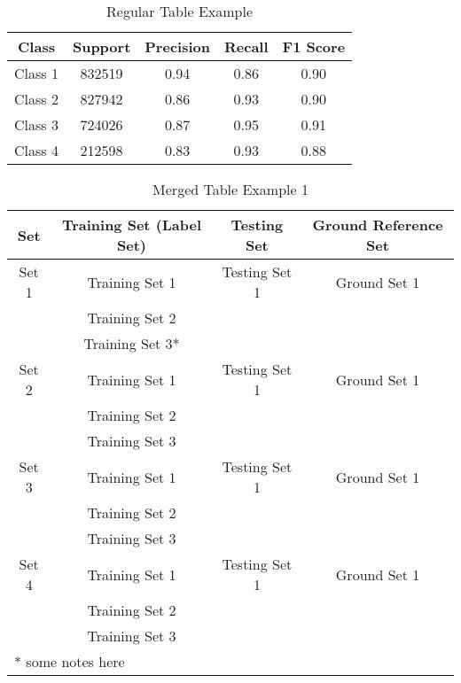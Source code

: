 %   
%   
%   
%   
%   
%   


\begin{table}
    \centering
    \caption{Regular Table Example}\label{tab:table-example}
    \begin{tabular}{|c|c|c|c|c|}
        \hline
        Class & Support & Precision & Recall & F1 Score\\
        \hline
        Class 1 & 832519 & 0.94 & 0.86 & 0.90\\
        Class 2 & 827942 & 0.86 & 0.93 & 0.90\\
        Class 3 & 724026 & 0.87 & 0.95 & 0.91\\
        Class 4 & 212598 & 0.83 & 0.93 & 0.88\\
        \hline
    \end{tabular}
\end{table}


\begin{table}[!htb]
    \centering
    \caption{Merged Table Example 1}\label{tab:merged-table-example-1}
    \begin{tabular}{|c|c|c|c|}
        \hline
        Set   & Training Set (Label Set) & Testing Set & Ground Reference Set\\
        \hline
        Set 1 & Training Set 1 & Testing Set 1 & Ground Set 1 \\
              & Training Set 2 & & \\
              & Training Set 3* & & \\
        \hline
        Set 2 & Training Set 1 & Testing Set 1 & Ground Set 1 \\
              & Training Set 2 & & \\
              & Training Set 3 & & \\
        \hline
        Set 3 & Training Set 1 & Testing Set 1 & Ground Set 1 \\
              & Training Set 2 & & \\
              & Training Set 3 & & \\
        \hline
        Set 4 & Training Set 1 & Testing Set 1 & Ground Set 1 \\
              & Training Set 2 & & \\
              & Training Set 3 & & \\    
        \hline
        \multicolumn{4}{|l|}{* some notes here} \\
        \hline
    \end{tabular}
\end{table}


